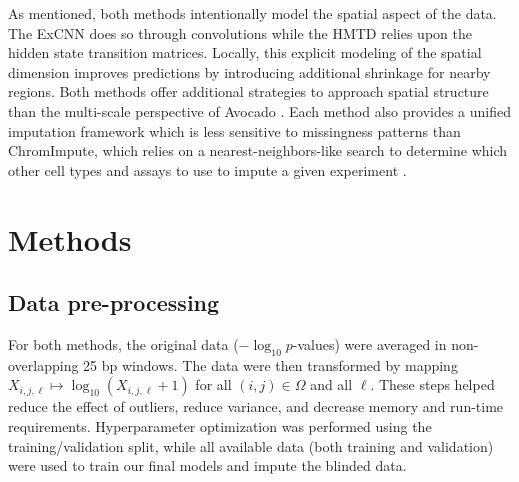 \documentclass[11pt]{article}
\begin{document}
As mentioned, both methods intentionally model the spatial aspect of the data. The ExCNN does so through convolutions while the HMTD relies upon the hidden state transition matrices. Locally, this explicit modeling of the spatial dimension improves predictions by introducing additional shrinkage for nearby regions. Both methods offer additional strategies to approach spatial structure than the multi-scale perspective of Avocado \cite{schreiber2019multi}. Each method also provides a unified imputation framework which is less sensitive to missingness patterns than ChromImpute, which relies on a nearest-neighbors-like search to determine which other cell types and assays to use to impute a given experiment \cite{ernst2015large}.

\section{Methods}

\subsection{Data pre-processing}
\label{sec:preprocess}
For both methods, the original data ($-\log_{10} p$-values) were averaged in non-overlapping 25 bp windows. The data were then transformed by mapping $X_{i,j,\ell} \mapsto \log_{10}(X_{i,j,\ell}+1)$ for all $(i,j) \in \Omega$ and all $\ell$. These steps helped reduce the effect of outliers, reduce variance, and decrease memory and run-time requirements. Hyperparameter optimization was performed using the training/validation split, while all available data (both training and validation) were used to train our final models and impute the blinded data.
\end{document}
